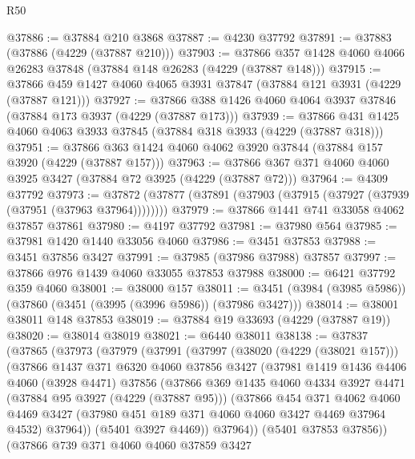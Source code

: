 \begin{lexlean}{R50}
\begin{coremodule}
@37886 := @37884 @210 @3868
@37887 := @4230 @37792
@37891 := @37883 (@37886 (@4229 (@37887 @210)))
@37903 := @37866 @357 @1428 @4060 @4066 @26283 @37848 (@37884 @148 @26283 (@4229 (@37887 @148)))
@37915 := @37866 @459 @1427 @4060 @4065 @3931 @37847 (@37884 @121 @3931 (@4229 (@37887 @121)))
@37927 := @37866 @388 @1426 @4060 @4064 @3937 @37846 (@37884 @173 @3937 (@4229 (@37887 @173)))
@37939 := @37866 @431 @1425 @4060 @4063 @3933 @37845 (@37884 @318 @3933 (@4229 (@37887 @318)))
@37951 := @37866 @363 @1424 @4060 @4062 @3920 @37844 (@37884 @157 @3920 (@4229 (@37887 @157)))
@37963 := @37866 @367 @371 @4060 @4060 @3925 @3427 (@37884 @72 @3925 (@4229 (@37887 @72)))
@37964 := @4309 @37792
@37973 := @37872 (@37877 (@37891 (@37903 (@37915 (@37927 (@37939 (@37951 (@37963 @37964))))))))
@37979 := @37866 @1441 @741 @33058 @4062 @37857 @37861
@37980 := @4197 @37792
@37981 := @37980 @564
@37985 := @37981 @1420 @1440 @33056 @4060
@37986 := @3451 @37853
@37988 := @3451 @37856 @3427
@37991 := @37985 (@37986 @37988) @37857
@37997 := @37866 @976 @1439 @4060 @33055 @37853 @37988
@38000 := @6421 @37792 @359 @4060
@38001 := @38000 @157
@38011 := @3451 (@3984 (@3985 @5986)) (@37860 (@3451 (@3995 (@3996 @5986)) (@37986 @3427)))
@38014 := @38001 @38011 @148 @37853
@38019 := @37884 @19 @33693 (@4229 (@37887 @19))
@38020 := @38014 @38019
@38021 := @6440 @38011
@38138 := @37837
    (@37865
      (@37973
        (@37979
          (@37991
            (@37997
              (@38020 (@4229 (@38021 @157)))
              (@37866
                @1437
                @371
                @6320
                @4060
                @37856
                @3427
                (@37981
                  @1419
                  @1436
                  @4406
                  @4060
                  (@3928 @4471)
                  @37856
                  (@37866
                    @369
                    @1435
                    @4060
                    @4334
                    @3927
                    @4471
                    (@37884 @95 @3927 (@4229 (@37887 @95)))
                    (@37866
                      @454
                      @371
                      @4062
                      @4060
                      @4469
                      @3427
                      (@37980 @451 @189 @371 @4060 @4060 @3427 @4469 @37964 @4532)
                      @37964))
                  (@5401 @3927 @4469))
                @37964))
            (@5401 @37853 @37856))
          (@37866
            @739
            @371
            @4060
            @4060
            @37859
            @3427

\end{coremodule}
\end{lexlean}
